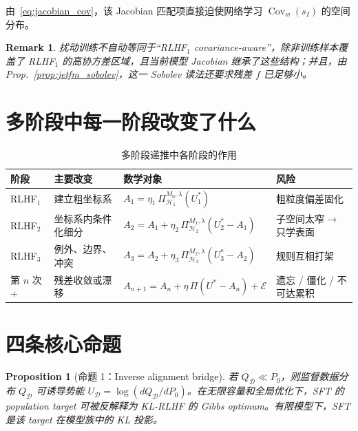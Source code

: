 \documentclass[11pt,a4paper]{article}
\newtheorem{proposition}[theorem]{Proposition}
\newtheorem{remark}[theorem]{Remark}
\DeclareMathOperator{\Cov}{Cov}
\newcommand{\cD}{\mathcal{D}}
\newcommand{\cH}{\mathcal{H}}
\newcommand{\cE}{\mathcal{E}}
\newcommand{\ProjectOp}{\Pi}
\begin{document}
由~\eqref{eq:jacobian_cov}，该 Jacobian 匹配项直接迫使网络学习 $\Cov_w(s_I)$ 的空间分布。

\begin{remark}
扰动训练不自动等同于“RLHF$_1$ covariance-aware”，除非训练样本覆盖了 RLHF$_1$ 的高协方差区域，且当前模型 Jacobian 继承了这些结构；并且，由 Prop.~\ref{prop:jetfm_sobolev}，这一 Sobolev 读法还要求残差 $f$ 已足够小。
\end{remark}

\section{多阶段中每一阶段改变了什么}
\label{sec:stages}

\begin{table}[htbp]
\centering
\caption{多阶段递推中各阶段的作用}
\label{tab:stages}
\small
\begin{tabular}{@{}p{1.6cm}p{4cm}p{4.4cm}p{3.5cm}@{}}
\toprule
\textbf{阶段} & \textbf{主要改变} & \textbf{数学对象} & \textbf{风险} \\
\midrule
RLHF$_1$ & 建立粗坐标系 & $A_1 = \eta_1\,\ProjectOp_{\cH_1}^{M_0,\lambda}(U_1^*)$ & 粗粒度偏差固化 \\[3pt]
RLHF$_2$ & 坐标系内条件化细分 & $A_2 = A_1 + \eta_2\,\ProjectOp_{\cH_2}^{M_1,\lambda}(U_2^* - A_1)$ & 子空间太窄$\to$只学表面 \\[3pt]
RLHF$_3$ & 例外、边界、冲突 & $A_3 = A_2 + \eta_3\,\ProjectOp_{\cH_3}^{M_2,\lambda}(U_3^* - A_2)$ & 规则互相打架 \\[3pt]
第 $n$ 次+ & 残差收敛或漂移 & $A_{n+1} = A_n + \eta\,\ProjectOp(U^* - A_n) + \cE$ & 遗忘 / 僵化 / 不可达累积 \\
\bottomrule
\end{tabular}
\end{table}

\section{四条核心命题}
\label{sec:propositions}

\begin{proposition}[命题 1：Inverse alignment bridge]
若 $Q_\cD \ll P_0$，则监督数据分布 $Q_\cD$ 可诱导势能 $U_\cD = \log(dQ_\cD/dP_0)$。在无限容量和全局优化下，SFT 的 population target 可被反解释为 KL-RLHF 的 Gibbs optimum。有限模型下，SFT 是该 target 在模型族中的 KL 投影。
\end{proposition}
\end{document}
